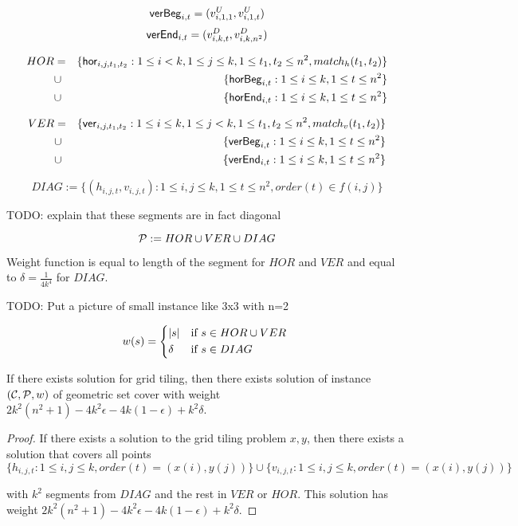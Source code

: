 $$\mathsf{verBeg}_{i,t} = (v^U_{i, 1, 1}, v^U_{i, 1, t})$$
$$\mathsf{verEnd}_{i,t} = (v^D_{i, k, t}, v^D_{i, k, n^2})$$

\begin{eqnarray*}
HOR &= &\{\mathsf{hor}_{i,j,t_1,t_2} : 1 \le i < k, 1 \le j \le k,
1 \le t_1, t_2 \le n^2, match_h(t_1, t_2)\} \\
&\cup &\{\mathsf{horBeg}_{i,t} : 1 \le i \le k, 1 \le t \le n^2\}
\\
&\cup &\{\mathsf{horEnd}_{i,t} : 1 \le i \le k, 1 \le t \le n^2\}
\end{eqnarray*}

\begin{eqnarray*}
VER &= &\{\mathsf{ver}_{i,j,t_1,t_2} : 1 \le i \le k, 1 \le j < k,
1 \le t_1, t_2 \le n^2, match_v(t_1, t_2)\} \\
&\cup &\{\mathsf{verBeg}_{i,t} : 1 \le i \le k, 1 \le t \le n^2\}
\\
&\cup &\{\mathsf{verEnd}_{i,t} : 1 \le i \le k, 1 \le t \le n^2\}
\end{eqnarray*}

$$DIAG := \{ (h_{i, j, t}, v_{i, j, t}) :
	1 \le i, j \le k, 1 \le t \le n^2, order(t) \in f(i, j)\}$$

TODO: explain that these segments are in fact diagonal

$$\mathcal{P} := HOR \cup VER \cup DIAG$$

Weight function is equal to length of the segment for $HOR$ and $VER$
and equal to $\delta = \frac{1}{4k^4}$ for $DIAG$.

TODO: Put a picture of small instance like 3x3 with n=2

\begin{equation}
w(s) =
	\begin{cases*}
	  |s| 			& if $s \in HOR \cup VER$ \\
	  \delta        & if $s \in DIAG$
	\end{cases*}
\end{equation}

\newcommand{\solWeight}{2k^2(n^2+1) - 4k^2\epsilon -4k(1-\epsilon) +k^2\delta }

\begin{lemma}
\label{set_cover_solution_exists}
	If there exists solution for grid tiling,
	then there exists solution of instance $(\mathcal{C}, \mathcal{P}, w)$
	of geometric set cover
	with weight $\solWeight$.
\end{lemma}

\begin{proof}
	If there exists a solution to the grid tiling problem
	$x, y$,
	then there exists a solution that covers
	all points
	$$\{h_{i, j, t} : 1 \le i, j \le k, order(t)=(x(i), y(j))\}
	\cup \{v_{i, j, t} : 1 \le i, j \le k, order(t)=(x(i), y(j))\}$$
	
	with $k^2$ segments from $DIAG$
	and the rest in $VER$ or $HOR$.
	This solution has weight $\solWeight$.
\end{proof}

